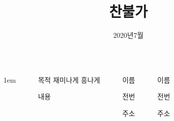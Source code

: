 \documentclass[20pt, a1paper ]{tikzposter}
\title{ 찬불가 }
\author{ 2020년7월 }
\begin{document}
	\maketitle

	\begin{columns}


			{
					\setlength{\leftmargini}{7em}
					\setlength{\labelsep} {1em}
				\begin{LARGE}
					\begin{itemize}
					\item [목적] 재미나게 흥나게
					\item [내용] 
					\end{itemize}
				\end{LARGE}
			}


		{
			\setlength{\leftmargini}{7em}			
			\setlength{\labelsep}{1em} %

			\begin{LARGE}
			\begin{itemize}
			\item [이름]
			\item [전번]
			\item [주소] 
			\end{itemize}
			\end{LARGE}

		}

		{
			\setlength{\leftmargini}{7em}			
			\setlength{\labelsep}{1em} %

			\begin{LARGE}
			\begin{itemize}
			\item [이름]
			\item [전번]
			\item [주소] 
			\end{itemize}
			\end{LARGE}

}
\end{columns}
\end{document}
